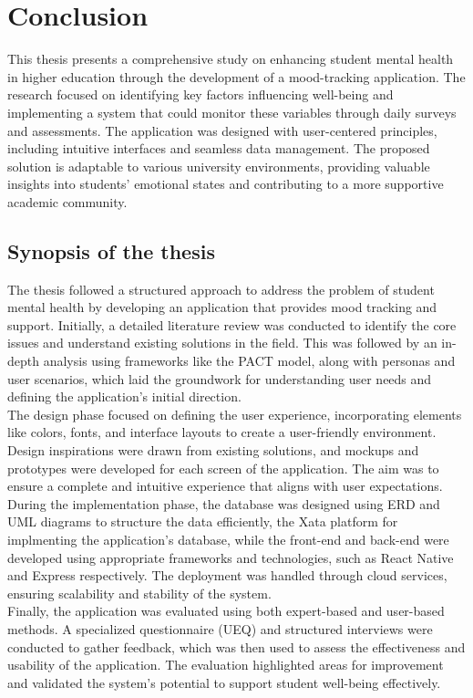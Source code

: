 \chapter{Conclusion}

This thesis presents a comprehensive study on enhancing student mental health in higher education through the development of a mood-tracking application. The research focused on identifying key factors influencing well-being and implementing a system that could monitor these variables through daily surveys and assessments. The application was designed with user-centered principles, including intuitive interfaces and seamless data management. The proposed solution is adaptable to various university environments, providing valuable insights into students' emotional states and contributing to a more supportive academic community.

\section{Synopsis of the thesis}

The thesis followed a structured approach to address the problem of student mental health by developing an application that provides mood tracking and support. Initially, a detailed literature review was conducted to identify the core issues and understand existing solutions in the field. This was followed by an in-depth analysis using frameworks like the PACT model, along with personas and user scenarios, which laid the groundwork for understanding user needs and defining the application’s initial direction.\vspace{5mm} \\
The design phase focused on defining the user experience, incorporating elements like colors, fonts, and interface layouts to create a user-friendly environment. Design inspirations were drawn from existing solutions, and mockups and prototypes were developed for each screen of the application. The aim was to ensure a complete and intuitive experience that aligns with user expectations.\vspace{5mm} \\
During the implementation phase, the database was designed using ERD and UML diagrams to structure the data efficiently, the Xata platform for implmenting the application's database, while the front-end and back-end were developed using appropriate frameworks and technologies, such as React Native and Express respectively. The deployment was handled through cloud services, ensuring scalability and stability of the system.\vspace{5mm} \\
Finally, the application was evaluated using both expert-based and user-based methods. A specialized questionnaire (UEQ) and structured interviews were conducted to gather feedback, which was then used to assess the effectiveness and usability of the application. The evaluation highlighted areas for improvement and validated the system’s potential to support student well-being effectively.

